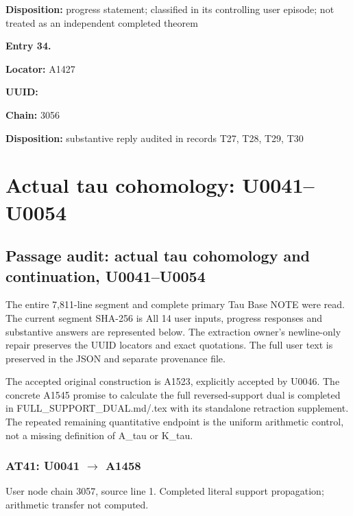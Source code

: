 \documentclass[10pt,a4paper,oneside]{report}
\begin{document}
\textbf{Disposition:} progress statement; classified in its controlling
user episode; not treated as an independent completed theorem


\textbf{Entry 34.}

\textbf{Locator:} A1427

\textbf{UUID:} \protect{}

\textbf{Chain:} 3056

\textbf{Disposition:} substantive reply audited in records T27, T28,
T29, T30

\clearpage

\chapter{Actual tau cohomology:
U0041--U0054}\label{actual-tau-cohomology-u0041u0054}

\section{Passage audit: actual tau cohomology and continuation,
U0041--U0054}\label{passage-audit-actual-tau-cohomology-and-continuation-u0041u0054}

The entire 7,811-line segment and complete primary Tau Base NOTE were
read. The current segment SHA-256 is
\protect{}
All 14 user inputs, progress responses and substantive answers are
represented below. The extraction owner's newline-only repair preserves
the UUID locators and exact quotations. The full user text is preserved
in the JSON and separate provenance file.

The accepted original construction is A1523, explicitly accepted by
U0046. The concrete A1545 promise to calculate the full reversed-support
dual is completed in FULL\_SUPPORT\_DUAL.md/.tex with its standalone
retraction supplement. The repeated remaining quantitative endpoint is
the uniform arithmetic control, not a missing definition of A\_tau or
K\_tau.

\subsection{\texorpdfstring{AT41: U0041
\allowbreak{}\ensuremath{→}\allowbreak{}
A1458}{AT41: U0041  A1458}}\label{at41-u0041-a1458}

User node \protect{} chain
3057, source line 1. Completed literal support propagation; arithmetic
transfer not computed.
\end{document}
